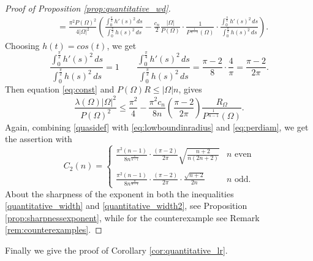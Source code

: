 \documentclass[oneside,a4paper,11pt,notitlepage]{article}
\newcommand{\abs}[1]{{\left|#1\right|}}
\theoremstyle{definition}
\theoremstyle{plain}
\theoremstyle{definition}
\begin{document}
\begin{proof}[Proof of Proposition \ref{prop:quantitative_wd}]
\begin{align*}
     &=\frac{\pi^2P(\Omega)^2}{4\abs{\Omega}^2}  \left(\frac{\displaystyle \int_{0}^{\frac{\pi}{2}}h'(s)^2\,ds }{\displaystyle\int_0^{\frac{\pi}{2}}h(s)^2\,ds}-\frac{c_n}{2}\frac{\abs{\Omega}}{P(\Omega)}\cdot\frac{1}{P^{\frac{1}{n-1}}(\Omega)}\cdot\frac{ \displaystyle\int_0^{\frac{\pi}{4}}h'(s)^2\,ds}{\displaystyle\int_0^{\frac{\pi}{2}}h(s)^2\,ds}\right).
\end{align*}
Choosing $h(t)= cos(t)$, we get 
\begin{equation}\label{eq:const}
    \frac{\displaystyle\int_0^{\frac{\pi}{2}}h'(s)^2\,ds}{\displaystyle\int_0^{\frac{\pi}{2}}h(s)^2\,ds}=1\qquad\frac{\displaystyle\int_0^{\frac{\pi}{4}}h'(s)^2\,ds}{\displaystyle\int_0^{\frac{\pi}{2}}h(s)^2\,ds}=\frac{\pi -2}{8}\cdot\frac{4}{\pi}=\frac{\pi -2}{2\pi}.
\end{equation}
Then equation \eqref{eq:const} and $P(\Omega)R \leq \abs{\Omega} n$, gives 
\begin{equation}
    \label{quasidef}
    \frac{\lambda(\Omega)\abs{\Omega}^2}{P(\Omega)^2}\leq\frac{\pi^2}{4} -  \frac{\pi^2 c_n}{8n} \left(\frac{\pi-2}{2\pi}\right) \frac{R_\Omega}{P^{\frac{1}{n-1}}(\Omega)}.
\end{equation}
Again, combining \eqref{quasidef} with \eqref{eq:lowboundinradius} and \eqref{eq:perdiam}, we get the assertion with 
\begin{equation*}
    \displaystyle C_2(n)=\begin{cases}
     \displaystyle{\frac{\pi^2(n-1)}{8n^{\frac{n}{n-1}}}\cdot\frac{(\pi-2)}{2\pi}\sqrt{\frac{n+2}{n(2n+2)}}} & n \,\, \text{even}\\ \\
       \displaystyle{\frac{\pi^2(n-1)}{8n^{\frac{n}{n-1}}}\cdot\frac{(\pi-2)}{2\pi}\cdot\frac{\sqrt{n+2}}{2n}} & n \,\, \text{odd}.
    \end{cases}
\end{equation*}
About the sharpness of the exponent in both the inequalities \eqref{quantitative_width} and \eqref{quantitative_width2}, see Proposition \ref{prop:sharpnessexponent}, while for the counterexample see Remark \ref{rem:counterexamples}.
\end{proof}

Finally we give the proof of Corollary \ref{cor:quantitative_lr}.
\end{document}
